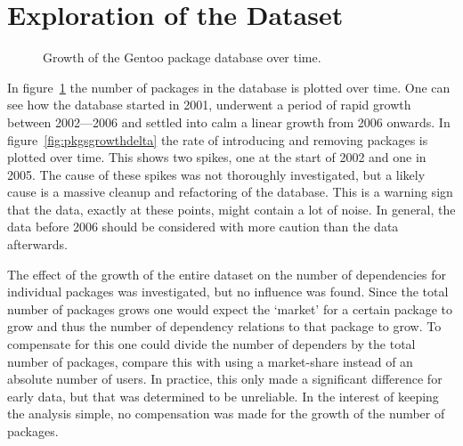 \documentclass[smallextended,final]{svjour3}
\begin{document}
\section{Exploration of the Dataset}

\begin{figure}
\small\centering
{}
\caption{Growth of the Gentoo package database over time.}\label{fig:pkgsgrowth}
\end{figure}

In figure~\ref{fig:pkgsgrowth} the number of packages in the database is plotted over time. One can see how the database started in 2001, underwent a period of rapid growth between 2002---2006 and settled into calm a linear growth from 2006 onwards. In figure~\ref{fig:pkgsgrowthdelta} the rate of introducing and removing packages is plotted over time. This shows two spikes, one at the start of 2002 and one in 2005. The cause of these spikes was not thoroughly investigated, but a likely cause is a massive cleanup and refactoring of the database. This is a warning sign that the data, exactly at these points, might contain a lot of noise. In general, the data before 2006 should be considered with more caution than the data afterwards.

The effect of the growth of the entire dataset on the number of dependencies for individual packages was investigated, but no influence was found. Since the total number of packages grows one would expect the `market' for a certain package to grow and thus the number of dependency relations to that package to grow. To compensate for this one could divide the number of dependers by the total number of packages, compare this with using a market-share instead of an absolute number of users. In practice, this only made a significant difference for early data, but that was determined to be unreliable. In the interest of keeping the analysis simple, no compensation was made for the growth of the number of packages.
\end{document}
